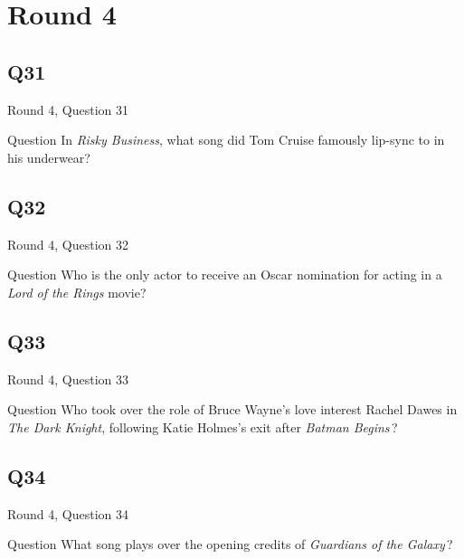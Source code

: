 \documentclass[11pt]{beamer}
\begin{document}
\section{Round 4}
    

\subsection*{Q31}
\begin{frame}[t]{Round 4, Question 31}
\vspace{2em}
\begin{block}{Question}
In \emph{Risky Business}, what song did Tom Cruise famously lip-sync to in his underwear?
\end{block}
\end{frame}
    

\subsection*{Q32}
\begin{frame}[t]{Round 4, Question 32}
\vspace{2em}
\begin{block}{Question}
Who is the only actor to receive an Oscar nomination for acting in a \emph{Lord of the Rings} movie?
\end{block}
\end{frame}
    

\subsection*{Q33}
\begin{frame}[t]{Round 4, Question 33}
\vspace{2em}
\begin{block}{Question}
Who took over the role of Bruce Wayne's love interest Rachel Dawes in \emph{The Dark Knight}, following Katie Holmes's exit after \emph{Batman Begins}\,?
\end{block}
\end{frame}
    

\subsection*{Q34}
\begin{frame}[t]{Round 4, Question 34}
\vspace{2em}
\begin{block}{Question}
What song plays over the opening credits of \emph{Guardians of the Galaxy}\,?
\end{block}
\end{frame}
    
\end{document}
